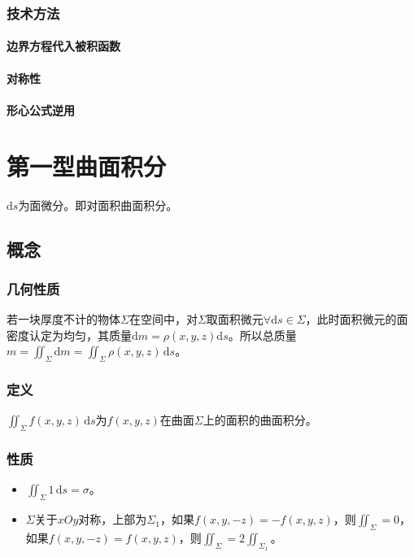 \subsubsection{技术方法}

\paragraph{边界方程代入被积函数} \leavevmode \medskip

\paragraph{对称性} \leavevmode \medskip

\paragraph{形心公式逆用} \leavevmode \medskip

\section{第一型曲面积分}

$\textrm{d}s$为面微分。即对面积曲面积分。

\subsection{概念}

\subsubsection{几何性质}

若一块厚度不计的物体$\Sigma$在空间中，对$\Sigma$取面积微元$\forall\textrm{d}s\in\Sigma$，此时面积微元的面密度认定为均匀，其质量$\textrm{d}m=\rho(x,y,z)\textrm{d}s$。所以总质量$m=\iint_\Sigma\textrm{d}m=\iint_\Sigma\rho(x,y,z)\,\textrm{d}s$。

\subsubsection{定义}

$\iint_\Sigma f(x,y,z)\,\textrm{d}s$为$f(x,y,z)$在曲面$\Sigma$上的面积的曲面积分。

\subsubsection{性质}

\begin{itemize}
    \item $\iint_\Sigma1\,\textrm{d}s=\sigma$。
    \item $\Sigma$关于$xOy$对称，上部为$\Sigma_1$，如果$f(x,y,-z)=-f(x,y,z)$，则$\iint_\Sigma=0$，如果$f(x,y,-z)=f(x,y,z)$，则$\iint_\Sigma=2\iint_{\Sigma_1}$。
\end{itemize}


